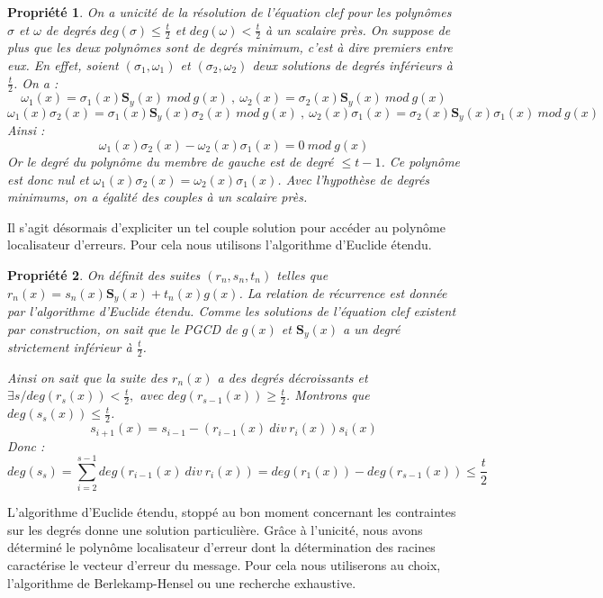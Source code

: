\documentclass{article}
\newtheorem{prop}{Propriété}
\begin{document}
		\begin{prop} \label{unicite} \cite{goppa}
			On a unicité de la résolution de l'équation clef pour les polynômes $\sigma$ et $\omega$ de degrés  $deg(\sigma) \leq \frac{t}{2}$ et $ deg(\omega) < \frac{t}{2} $ à un scalaire près.
			On suppose de plus que les deux polynômes sont de degrés minimum, c'est à dire premiers entre eux.
			En effet, soient $(\sigma_{1},\omega_{1})$ et $(\sigma_{2},\omega_{2})$ deux solutions de degrés inférieurs à $\frac{t}{2}$.
			On a :
			$$ \omega_{1}(x) = \sigma_{1}(x)\mathbf{S}_{y}(x) \ mod \ g(x) \ , \ \omega_{2}(x) = \sigma_{2}(x)\mathbf{S}_{y}(x) \ mod \ g(x) $$
			$$ \omega_{1}(x)\sigma_{2}(x) = \sigma_{1}(x)\mathbf{S}_{y}(x)\sigma_{2}(x) \ mod \ g(x) \ , \ \omega_{2}(x)\sigma_{1}(x) = \sigma_{2}(x)\mathbf{S}_{y}(x)\sigma_{1}(x) \ mod \ g(x) $$
			Ainsi :
			$$ \omega_{1}(x)\sigma_{2}(x) - \omega_{2}(x)\sigma_{1}(x) = 0 \ mod \ g(x) $$
			Or le degré du polynôme du membre de gauche est de degré $\leq t-1$.
			Ce polynôme est donc nul et $ \omega_{1}(x)\sigma_{2}(x) = \omega_{2}(x)\sigma_{1}(x) $.
			Avec l'hypothèse de degrés minimums, on a égalité des couples à un scalaire près.
		\end{prop}

		Il s'agit désormais d'expliciter un tel couple solution pour accéder au polynôme localisateur d'erreurs.
		Pour cela nous utilisons l'algorithme d'Euclide étendu.

		\begin{prop} \label{existence}
			On définit des suites $(r_{n},s_{n},t_{n})$ telles que $ r_{n}(x) = s_{n}(x)\mathbf{S}_{y}(x) + t_{n}(x)g(x) $.
			La relation de récurrence est donnée par l'algorithme d'Euclide étendu.
			Comme les solutions de l'équation clef existent par construction, on sait que le PGCD de $g(x)$ et $\mathbf{S}_{y}(x)$ a un degré strictement inférieur à $\frac{t}{2}$.

			Ainsi on sait que la suite des $r_{n}(x)$ a des degrés décroissants et $\exists s / deg(r_{s}(x)) < \frac{t}{2},$ avec $deg(r_{s-1}(x)) \geq \frac{t}{2}$.
			Montrons que $deg(s_{s}(x)) \leq \frac{t}{2}$.
			$$ s_{i+1}(x) = s_{i-1} - (r_{i-1}(x) \ div  \ r_{i}(x))s_{i}(x) $$
			Donc :
			$$ deg(s_{s}) = \sum_{i=2}^{s-1} deg(r_{i-1}(x) \ div  \ r_{i}(x)) = deg(r_{1}(x)) - deg(r_{s-1}(x)) \leq \frac{t}{2}$$
		\end{prop}

		L'algorithme d'Euclide étendu, stoppé au bon moment concernant les contraintes sur les degrés donne une solution particulière.
		Grâce à l'unicité, nous avons déterminé le polynôme localisateur d'erreur dont la détermination des racines caractérise le vecteur d'erreur du message.
		Pour cela nous utiliserons au choix, l'algorithme de Berlekamp-Hensel ou une recherche exhaustive.





\end{document}
